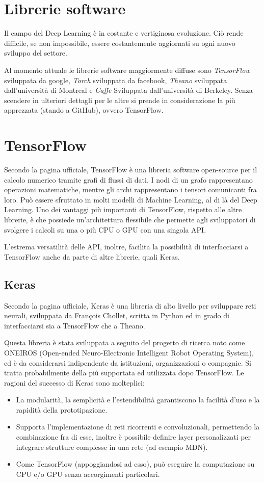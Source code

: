 \section{Librerie software}
Il campo del Deep Learning è in costante e vertiginosa evoluzione. Ciò rende difficile, se non impossibile, essere costantemente aggiornati su ogni nuovo sviluppo del settore.

Al momento attuale le librerie software maggiormente diffuse sono \textit{TensorFlow} sviluppata da google, \textit{Torch} sviluppata da facebook, \textit{Theano} sviluppata dall'università di Montreal e \textit{Caffe} Sviluppata dall'università di Berkeley. Senza scendere in ulteriori dettagli per le altre si prende in considerazione la più apprezzata (stando a GitHub), ovvero TensorFlow.
\section{TensorFlow} %
\label{sec:tensorflow}
Secondo la pagina ufficiale\cite{tensorflow}, TensorFlow è una libreria software open-source per il calcolo numerico tramite grafi di flussi di dati. I nodi di un grafo rappresentano operazioni matematiche, mentre gli archi rappresentano i tensori comunicanti fra loro. Può essere sfruttato in molti modelli di Machine Learning, al di là del Deep Learning. Uno dei vantaggi più importanti di TensorFlow, rispetto alle altre librerie, è che possiede un'architettura flessibile che permette agli sviluppatori di svolgere i calcoli su una o più CPU o GPU con una singola API.

L'estrema versatilità delle API, inoltre, facilita la possibilità di interfacciarsi a TensorFlow anche da parte di altre librerie, quali Keras.
\subsection{Keras}
Secondo la pagina ufficiale\cite{keras}, Keras è una libreria di alto livello per sviluppare reti neurali, sviluppata da Fran\c{c}ois Chollet, scritta in Python ed in grado di interfacciarsi sia a TensorFlow che a Theano.

Questa libreria è stata sviluppata a seguito del progetto di ricerca noto come ONEIROS (Open-ended Neuro-Electronic Intelligent Robot Operating System), ed è da considerarsi indipendente da istituzioni, organizzazioni o compagnie. Si tratta probabilmente della più supportata ed utilizzata dopo TensorFlow. Le ragioni del successo di Keras sono molteplici: 
\begin{itemize}
	\item La modularità, la semplicità e l'estendibilità garantiscono la facilità d'uso e la rapidità della prototipazione.
	\item Supporta l'implementazione di reti ricorrenti e convoluzionali, permettendo la combinazione fra di esse, inoltre è possibile definire layer personalizzati per integrare strutture complesse in una rete (ad esempio MDN).
	\item Come TensorFlow (appoggiandosi ad esso), può eseguire la computazione su CPU e/o GPU senza accorgimenti particolari.
\end{itemize}

